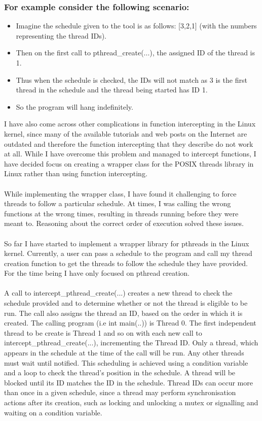 \documentclass[a4paper,11pt]{article}
\begin{document}
\subsubsection*{For example consider the following scenario:}
\begin{itemize}
\item[]
Imagine the schedule given to the tool is as follows: [3,2,1] (with the numbers representing the thread IDs).


\item[]
Then on the first call to pthread\_create(...), the assigned ID of the thread is 1. 
\item[]
Thus when the schedule is checked, the IDs will not match as 3 is the first thread in the schedule and the thread being started has ID 1. 
\item[]
So the program will hang indefinitely.


\end{itemize}
I have also come across other complications in function intercepting in the Linux kernel, since many of the available tutorials and web posts on the Internet are outdated and therefore the function intercepting that they describe do not work at all. While I have overcome this problem and managed to intercept functions, I have decided focus on creating a wrapper class for the POSIX threads library in Linux rather than using function intercepting.
\\
\\
While implementing the wrapper class, I have found it challenging to force threads to follow a particular schedule. At times, I was calling the wrong functions at the wrong times, resulting in threads running before they were meant to. Reasoning about the correct order of execution solved these issues.
\\
\\
So far I have started to implement a wrapper library for pthreads in the Linux kernel. Currently, a user can pass a schedule to the program and call my thread creation function to get the threads to follow the schedule they have provided. For the time being I have only focused on pthread creation.
\\
\\
A call to intercept\_pthread\_create(...) creates a new thread to check the schedule provided and to determine whether or not the thread is eligible to be run. The call also assigns the thread an ID, based on the order in which it is created. The calling program (i.e int main(..)) is Thread 0. The first independent thread to be create is Thread 1 and so on with each new call to intercept\_pthread\_create(...), incrementing the Thread ID. Only a thread, which appears in the schedule at the time of the call will be run. Any other threads must wait until notified. This scheduling is achieved using a condition variable and a loop to check the thread's position in the schedule. A thread will be blocked until its ID matches the ID in the schedule. Thread IDs can occur more than once in a given schedule, since a thread may perform synchronisation actions after its creation, such as locking and unlocking a mutex or signalling and waiting on a condition variable.
\end{document}
